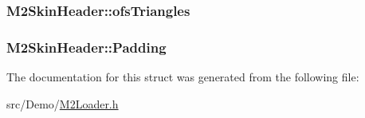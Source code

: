 \hypertarget{struct_m2_skin_header_a53639c7df755f615f80f8b16110ee422}{
\subsubsection[{ofs\+Triangles}]{ M2\+Skin\+Header\+::ofs\+Triangles}}\label{struct_m2_skin_header_a53639c7df755f615f80f8b16110ee422}
\hypertarget{struct_m2_skin_header_a678f172dbc9e440d4ab320eb07709803}{
\subsubsection[{Padding}]{ M2\+Skin\+Header\+::\+Padding}}\label{struct_m2_skin_header_a678f172dbc9e440d4ab320eb07709803}


The documentation for this struct was generated from the following file\+:\begin{DoxyCompactItemize}
\item 
src/\+Demo/\hyperlink{_m2_loader_8h}{M2\+Loader.\+h}\end{DoxyCompactItemize}
